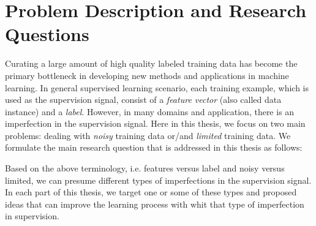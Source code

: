 \section{Problem Description and Research Questions}
Curating a large amount of high quality labeled training data has become the primary bottleneck in developing new methods and applications in machine learning. 
In general supervised learning scenario, each training example, which is used as the supervision signal, consist of a \emph{feature vector} (also called data instance) and a \emph{label}. However, in many domains and application, there is an imperfection in the supervision signal. Here in this thesis, we focus on two main problems: dealing with \emph{noisy} training data or/and \emph{limited} training data. 
We formulate the main research question that is addressed in this thesis as follows:

Based on the above terminology, i.e. features versus label and noisy versus limited, we can presume different types of imperfections in the supervision signal. In each part of this thesis, we target one or some of these types and proposed ideas that can improve the learning process with whit that type of imperfection in supervision. 

